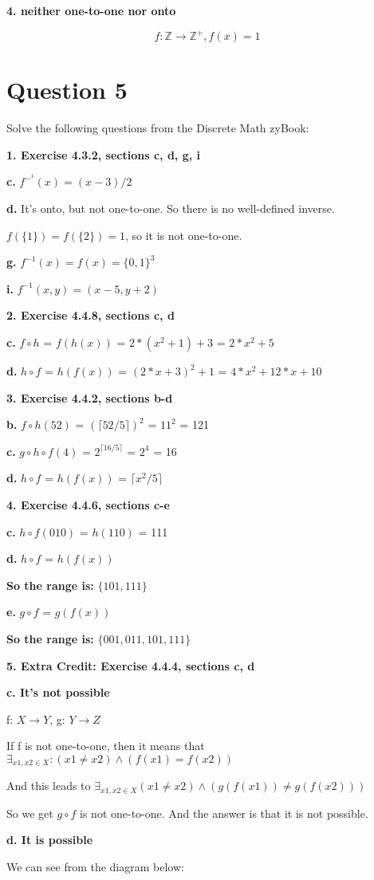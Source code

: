 \documentclass[11pt]{article}
\begin{document}
	\textbf{4. neither one-to-one nor onto}
	
	\begin{equation*}
	    f\colon\mathbb{Z}\rightarrow\mathbb{Z^+}, f(x) = 1
	\end{equation*}
	
	\newpage
	\section*{Question 5}
	
	Solve the following questions from the Discrete Math zyBook:
	
	\textbf{1. Exercise 4.3.2, sections c, d, g, i}
	
	\textbf{c.}
	$f^-^1(x)=(x-3)/2$
	
	\textbf{d.}
	It's onto, but not one-to-one. So there is no well-defined inverse.
	
	$f(\{1\})=f(\{2\})=1$, so it is not one-to-one.
	
	\textbf{g.}
	$f^{-1}(x)=f(x)=\{0,1\}^3$
	
	\textbf{i.}
	$f^{-1}(x,y)=(x-5,y+2)$
	
	\vspace{10mm}
	\textbf{2. Exercise 4.4.8, sections c, d}
	
	\textbf{c.}
	$f\circ h$ = $f(h(x))$ = $2*(x^2+1)+3$ = $2*x^2+5$
	
	\textbf{d.}
	$h\circ f$ = $h(f(x))$ = $(2*x+3)^2+1$ = $4*x^2+12*x+10$
	
	\vspace{10mm}
	\textbf{3. Exercise 4.4.2, sections b-d}
	
	\textbf{b.}
	$f\circ h(52)$ = $(\lceil 52/5\rceil)^2$ = $11^2$ = 121
	
	\textbf{c.}
	$g\circ h\circ f(4)$ = $2^{\lceil 16/5\rceil}$ = $2^4$ = 16
	
	\textbf{d.}
	$h\circ f$ = $h(f(x))$ = $\lceil x^2/5\rceil$
	
	\vspace{10mm}
	\textbf{4. Exercise 4.4.6, sections c-e}
	
	\textbf{c.}
	$h\circ f(010)$ = $h(110)$ = 111
	
	\textbf{d.}
	$h\circ f$ = $h(f(x))$
	
	\textbf{So the range is:} $\{101,111\}$
	
	\textbf{e.}
	$g\circ f$ = $g(f(x))$
	
	\textbf{So the range is:} $\{001,011,101,111\}$
	
	\vspace{10mm}
	\textbf{5. Extra Credit: Exercise 4.4.4, sections c, d}
	
	\textbf{c. It's not possible}
	
	f: $X\rightarrow Y$, g: $Y\rightarrow Z$
	
	If f is not one-to-one, then it means that $\exists_{x1, x2 \in X}: (x1\neq x2)\wedge (f(x1)=f(x2))$
	
	And this leads to 
	$\exists_{x1,x2\in X}(x1\neq x2)\wedge(g(f(x1))\neq g(f(x2)))$
	
	So we get $g\circ f$ is not one-to-one. And the answer is that it is not possible.
	
	\textbf{d. It is possible}

	We can see from the diagram below:
	
\end{document}
